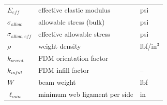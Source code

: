 \documentclass[11pt,letterpaper]{article}
\begin{document}
\begin{center}
\begin{tabular}{lll}
$E_{eff}$ & effective elastic modulus & psi \\
$\sigma_{allow}$ & allowable stress (bulk) & psi \\
$\sigma_{allow,eff}$ & effective allowable stress & psi \\
$\rho$ & weight density & lbf/in$^3$ \\
$k_{orient}$ & FDM orientation factor & -- \\
$k_{infill}$ & FDM infill factor & -- \\
$W$ & beam weight & lbf \\
$\ell_{min}$ & minimum web ligament per side & in \\
\bottomrule
\end{tabular}
\end{center}
\end{document}
